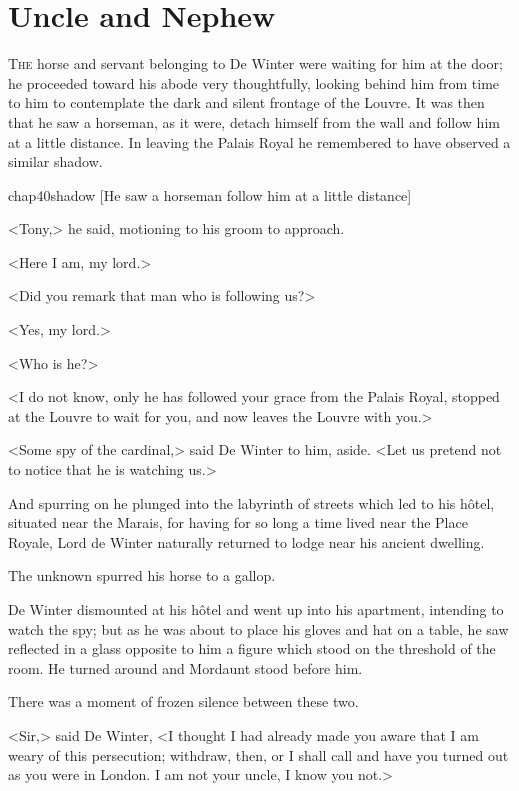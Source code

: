 \chapter{Uncle and Nephew}

 \lettrine{T}{he} horse and servant belonging to De Winter were waiting for him at the door; he proceeded toward his abode very thoughtfully, looking behind him from time to him to contemplate the dark and silent frontage of the Louvre. It was then that he saw a horseman, as it were, detach himself from the wall and follow him at a little distance. In leaving the Palais Royal he remembered to have observed a similar shadow.

\begin{bwbigpic}
	[\basicscale] 
	{chap40shadow}
	[He saw a horseman follow him at a little distance]
\end{bwbigpic}

<Tony,> he said, motioning to his groom to approach.

<Here I am, my lord.>

<Did you remark that man who is following us?>

<Yes, my lord.>

<Who is he?>

<I do not know, only he has followed your grace from the Palais Royal, stopped at the Louvre to wait for you, and now leaves the Louvre with you.>

<Some spy of the cardinal,> said De Winter to him, aside. <Let us pretend not to notice that he is watching us.>

And spurring on he plunged into the labyrinth of streets which led to his hôtel, situated near the Marais, for having for so long a time lived near the Place Royale, Lord de Winter naturally returned to lodge near his ancient dwelling.

The unknown spurred his horse to a gallop.

De Winter dismounted at his hôtel and went up into his apartment, intending to watch the spy; but as he was about to place his gloves and hat on a table, he saw reflected in a glass opposite to him a figure which stood on the threshold of the room. He turned around and Mordaunt stood before him.

There was a moment of frozen silence between these two.

<Sir,> said De Winter, <I thought I had already made you aware that I am weary of this persecution; withdraw, then, or I shall call and have you turned out as you were in London. I am not your uncle, I know you not.>

